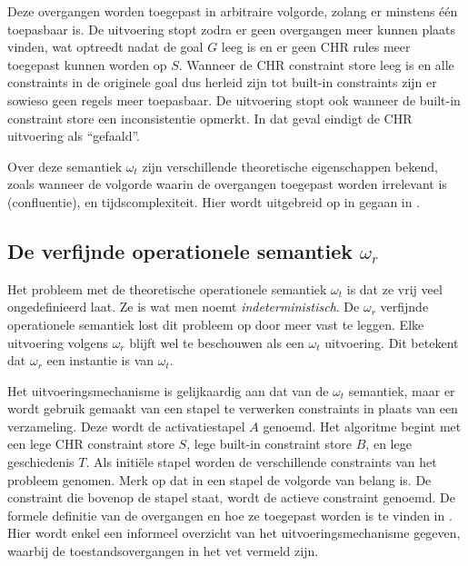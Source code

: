 Deze overgangen worden toegepast in arbitraire volgorde, zolang er minstens \'e\'en toepasbaar is. De uitvoering stopt zodra er geen overgangen meer kunnen plaats vinden, wat optreedt nadat de goal $G$ leeg is en er geen CHR rules meer toegepast kunnen worden op $S$. Wanneer de CHR constraint store leeg is en alle constraints in de originele goal dus herleid zijn tot built-in constraints zijn er sowieso geen regels meer toepasbaar. De uitvoering stopt ook wanneer de built-in constraint store een inconsistentie opmerkt. In dat geval eindigt de CHR uitvoering als ``gefaald''.

Over deze semantiek $\omega_t$ zijn verschillende theoretische eigenschappen bekend, zoals wanneer de volgorde waarin de overgangen toegepast worden irrelevant is (confluentie), en tijdscomplexiteit. Hier wordt uitgebreid op in gegaan in \cite{tomsphdthesis}.

\subsection{De verfijnde operationele semantiek $\omega_r$}

Het probleem met de theoretische operationele semantiek $\omega_t$ is dat ze vrij veel ongedefinieerd laat. Ze is wat men noemt {\em indeterministisch}. De $\omega_r$ verfijnde operationele semantiek lost dit probleem op door meer vast te leggen. Elke uitvoering volgens $\omega_r$ blijft wel te beschouwen als een $\omega_t$ uitvoering. Dit betekent dat $\omega_r$ een instantie is van $\omega_t$. 

Het uitvoeringsmechanisme is gelijkaardig aan dat van de $\omega_t$ semantiek, maar er wordt gebruik gemaakt van een stapel te verwerken constraints in plaats van een verzameling. Deze wordt de activatiestapel $A$ genoemd. Het algoritme begint met een lege CHR constraint store $S$, lege built-in constraint store $B$, en lege geschiedenis $T$. Als initi\"ele stapel worden de verschillende constraints van het probleem genomen. Merk op dat in een stapel de volgorde van belang is. De constraint die bovenop de stapel staat, wordt de actieve constraint genoemd. De formele definitie van de overgangen en hoe ze toegepast worden is te vinden in \cite{tomsphdthesis}. Hier wordt enkel een informeel overzicht van het uitvoeringsmechanisme gegeven, waarbij de toestandsovergangen in het vet vermeld zijn.

